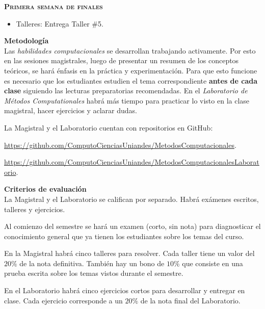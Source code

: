 \documentclass[letterpaper,10pt,onecolumn]{article}
\begin{document}
\noindent\textbf{\textsc{Primera semana de finales}}\\[-0.5cm]
\begin{itemize}
\item Talleres: Entrega Taller \#5. \\[-0.6cm]
\end{itemize}

\noindent\textbf{\large {} \quad
  Metodolog\'ia}\\[-0.2cm] 


\noindent\normalsize 
Las \emph{habilidades computacionales} se desarrollan trabajando activamente. 
Por esto en las sesiones magistrales, luego de presentar un resumen de
los conceptos te\'oricos, se har\'a \'enfasis en la pr\'actica y
experimentaci\'on.   
Para que esto funcione es necesario que los estudiantes estudien el
tema correspondiente {\bf antes de cada clase} siguiendo las lecturas
preparatorias recomendadas. En el \emph{Laboratorio de M\'etodos
  Computationales} habr\'a m\'as tiempo para practicar lo visto en la
clase magistral, hacer ejercicios y aclarar dudas.   

La Magistral y el Laboratorio cuentan con repositorios  en GitHub:

\url{https://github.com/ComputoCienciasUniandes/MetodosComputacionales}. 

\url{https://github.com/ComputoCienciasUniandes/MetodosComputacionalesLaboratorio}. 


\noindent\textbf{\large {} \quad Criterios de
  evaluaci\'on}\\[-0.2cm] 

La Magistral y el Laboratorio se califican por separado. 
Habr\'a ex\'amenes escritos, talleres y ejercicios.

Al comienzo del semestre se har\'a un examen (corto, sin nota) para
diagnosticar el conocimiento general que ya tienen los estudiantes
sobre los temas del curso. 

En la Magistral habr\'a cinco talleres para resolver.
Cada taller tiene un valor del $20\%$ de la nota definitiva.  
Tambi\'en hay un bono de $10\%$ que consiste en una prueba escrita
sobre los temas vistos durante el semestre.  

En el Laboratorio habr\'a cinco ejercicios cortos para desarrollar y
entregar en clase.  
Cada ejercicio corresponde a un $20\%$ de la nota final del
Laboratorio. 
\end{document}
